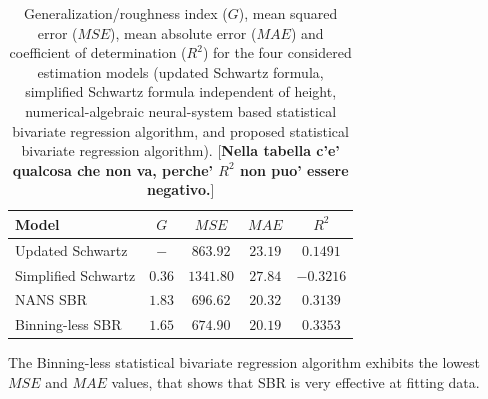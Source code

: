 \documentclass[10pt,final]{siamltex}
\begin{document}
%
\begin{table}[ht]
  \centering
  \begin{tabular}{|l|c|c|c|c|}
    \hline
    \textbf{Model}             &$\mathit{G}$  &$\mathit{MSE}$  &$\mathit{MAE}$  &$R^2$    \\
    \hline
    Updated Schwartz           &$ - $ &$863.92$  &$23.19$  &$ 0.1491$  \\
    Simplified Schwartz        &$0.36$  &$1341.80$ &$27.84$  &$-0.3216$  \\
    NANS SBR                   &$1.83$  &$696.62$  &$20.32$  &$ 0.3139$  \\
    Binning-less SBR           &$1.65$  &$674.90$  &$20.19$  &$ 0.3353$  \\
    \hline
  \end{tabular}
  \caption{Generalization/roughness index ($\mathit{G}$), mean squared error ($\mathit{MSE}$), mean absolute error ($\mathit{MAE}$) and coefficient of determination ($R^2$) for the four considered estimation models (updated Schwartz formula, simplified Schwartz formula independent of height, numerical-algebraic neural-system based statistical bivariate regression algorithm, and proposed statistical bivariate regression algorithm). [{\bf\red Nella tabella c'e' qualcosa che non va, perche' $R^2$ non puo' essere negativo.}]}
  \label{regstats}
\end{table}

The Binning-less statistical bivariate regression algorithm exhibits the lowest $\textit{MSE}$ and $\textit{MAE}$ values, that shows that SBR is very effective at fitting data.
%
\end{document}
